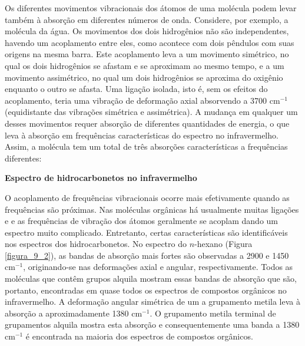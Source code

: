 Os diferentes movimentos vibracionais dos átomos de uma molécula podem levar também à absorção em diferentes números de onda. Considere, por exemplo, a molécula da água. Os movimentos dos dois hidrogênios não são independentes, havendo um acoplamento entre eles, como acontece com dois pêndulos com suas origens na mesma barra. Este acoplamento leva a um movimento simétrico, no qual os dois hidrogênios se afastam e se aproximam ao mesmo tempo, e a um movimento assimétrico, no qual um dois hidrogênios se aproxima do oxigênio enquanto o outro se afasta. Uma ligação  isolada, isto é, sem os efeitos do acoplamento, teria uma vibração de deformação axial absorvendo a 3700 cm$^{-1}$ (equidistante das vibrações simétrica e assimétrica). A mudança em qualquer um desses movimentos requer absorção de diferentes quantidades de energia, o que leva à absorção em frequências características do espectro no infravermelho. Assim, a molécula  tem um total de três absorções características a frequências diferentes:

\begin{figure}[H]
    \centering
    \chemnameinit{}
    \chemnameinit{}
    \qquad\qquad\qquad\qquad
    \chemnameinit{}
    \qquad\qquad\qquad\qquad
    \chemnameinit{}
\end{figure}

\noindent\textbf{Espectro de hidrocarbonetos no infravermelho}

O acoplamento de frequências vibracionais ocorre mais efetivamente quando as frequências são próximas. Nas moléculas orgânicas há usualmente muitas ligações  e  e as frequências de vibração dos átomos geralmente se acoplam dando um espectro muito complicado. Entretanto, certas características são identificáveis nos espectros dos hidrocarbonetos. No espectro do $n$-hexano (Figura \ref{figura_9_2}), as bandas de absorção mais fortes são observadas a 2900 e 1450 cm$^{-1}$, originando-se nas deformações axial e angular, respectivamente. Todos as moléculas que contêm grupos alquila mostram essas bandas de absorção que são, portanto, encontradas em quase todos os espectros de compostos orgânicos no infravermelho. A deformação angular simétrica de um a grupamento metila leva à absorção a aproximadamente 1380 cm$^{-1}$. O grupamento metila terminal de grupamentos alquila mostra esta absorção e consequentemente uma banda a 1380 cm$^{-1}$ é encontrada na maioria dos espectros de compostos orgânicos.

